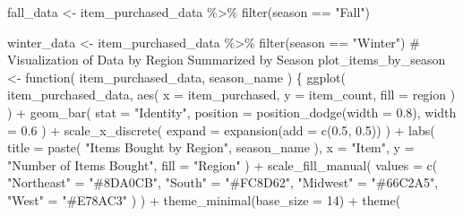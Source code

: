 \documentclass[
  letterpaper,
  DIV=11,
  numbers=noendperiod]{scrartcl}
\newenvironment{Shaded}{\begin{snugshade}}{\end{snugshade}}
\newcommand{\AttributeTok}[1]{\textcolor[rgb]{0.40,0.45,0.13}{#1}}
\newcommand{\CommentTok}[1]{\textcolor[rgb]{0.37,0.37,0.37}{#1}}
\newcommand{\ControlFlowTok}[1]{\textcolor[rgb]{0.00,0.23,0.31}{#1}}
\newcommand{\DecValTok}[1]{\textcolor[rgb]{0.68,0.00,0.00}{#1}}
\newcommand{\FloatTok}[1]{\textcolor[rgb]{0.68,0.00,0.00}{#1}}
\newcommand{\FunctionTok}[1]{\textcolor[rgb]{0.28,0.35,0.67}{#1}}
\newcommand{\NormalTok}[1]{\textcolor[rgb]{0.00,0.23,0.31}{#1}}
\newcommand{\OtherTok}[1]{\textcolor[rgb]{0.00,0.23,0.31}{#1}}
\newcommand{\SpecialCharTok}[1]{\textcolor[rgb]{0.37,0.37,0.37}{#1}}
\newcommand{\StringTok}[1]{\textcolor[rgb]{0.13,0.47,0.30}{#1}}
\begin{document}
\begin{Shaded}
\begin{Highlighting}[]
\NormalTok{fall\_data }\OtherTok{\textless{}{-}}\NormalTok{ item\_purchased\_data }\SpecialCharTok{\%\textgreater{}\%}
  \FunctionTok{filter}\NormalTok{(season }\SpecialCharTok{==} \StringTok{"Fall"}\NormalTok{)}

\NormalTok{winter\_data }\OtherTok{\textless{}{-}}\NormalTok{ item\_purchased\_data }\SpecialCharTok{\%\textgreater{}\%}
  \FunctionTok{filter}\NormalTok{(season }\SpecialCharTok{==} \StringTok{"Winter"}\NormalTok{)}
\CommentTok{\# Visualization of Data by Region Summarized by Season}
\NormalTok{plot\_items\_by\_season }\OtherTok{\textless{}{-}} \ControlFlowTok{function}\NormalTok{(}
\NormalTok{    item\_purchased\_data, }
\NormalTok{    season\_name}
\NormalTok{    ) \{}
\FunctionTok{ggplot}\NormalTok{(}
\NormalTok{  item\_purchased\_data, }
  \FunctionTok{aes}\NormalTok{(}
    \AttributeTok{x =}\NormalTok{ item\_purchased,}
    \AttributeTok{y =}\NormalTok{ item\_count, }
    \AttributeTok{fill =}\NormalTok{ region}
\NormalTok{  )}
\NormalTok{) }\SpecialCharTok{+}
  \FunctionTok{geom\_bar}\NormalTok{(}
    \AttributeTok{stat =} \StringTok{"Identity"}\NormalTok{, }
    \AttributeTok{position =} \FunctionTok{position\_dodge}\NormalTok{(}\AttributeTok{width =} \FloatTok{0.8}\NormalTok{), }
    \AttributeTok{width =} \FloatTok{0.6}
\NormalTok{  ) }\SpecialCharTok{+}
  \FunctionTok{scale\_x\_discrete}\NormalTok{(}
    \AttributeTok{expand =} \FunctionTok{expansion}\NormalTok{(}\AttributeTok{add =} \FunctionTok{c}\NormalTok{(}\FloatTok{0.5}\NormalTok{, }\FloatTok{0.5}\NormalTok{))}
\NormalTok{  ) }\SpecialCharTok{+}
  \FunctionTok{labs}\NormalTok{(}
    \AttributeTok{title =} \FunctionTok{paste}\NormalTok{(}
      \StringTok{"Items Bought by Region"}\NormalTok{, }
\NormalTok{      season\_name}
\NormalTok{    ),  }
    \AttributeTok{x =} \StringTok{"Item"}\NormalTok{, }
    \AttributeTok{y =} \StringTok{"Number of Items Bought"}\NormalTok{, }
    \AttributeTok{fill =} \StringTok{"Region"}
\NormalTok{  ) }\SpecialCharTok{+}
  \FunctionTok{scale\_fill\_manual}\NormalTok{(}
    \AttributeTok{values =} \FunctionTok{c}\NormalTok{(}
      \StringTok{"Northeast"} \OtherTok{=} \StringTok{"\#8DA0CB"}\NormalTok{, }
      \StringTok{"South"} \OtherTok{=} \StringTok{"\#FC8D62"}\NormalTok{, }
      \StringTok{"Midwest"} \OtherTok{=} \StringTok{"\#66C2A5"}\NormalTok{, }
      \StringTok{"West"} \OtherTok{=} \StringTok{"\#E78AC3"}
\NormalTok{    )}
\NormalTok{  ) }\SpecialCharTok{+}
  \FunctionTok{theme\_minimal}\NormalTok{(}\AttributeTok{base\_size =} \DecValTok{14}\NormalTok{) }\SpecialCharTok{+}
  \FunctionTok{theme}\NormalTok{(}

\end{Highlighting}
\end{Shaded}
\end{document}

